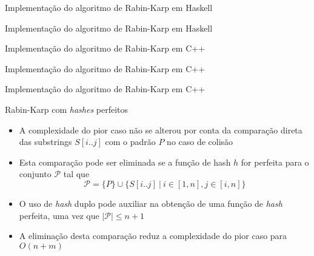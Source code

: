 \begin{frame}[fragile]{Implementação do algoritmo de Rabin-Karp em Haskell}
\end{frame}

\begin{frame}[fragile]{Implementação do algoritmo de Rabin-Karp em Haskell}
\end{frame}

\begin{frame}[fragile]{Implementação do algoritmo de Rabin-Karp em C++}
\end{frame}

\begin{frame}[fragile]{Implementação do algoritmo de Rabin-Karp em C++}
\end{frame}

\begin{frame}[fragile]{Implementação do algoritmo de Rabin-Karp em C++}
\end{frame}


\begin{frame}[fragile]{Rabin-Karp com {\it hashes} perfeitos}

    \begin{itemize}
        \item A complexidade do pior caso não se alterou por conta da comparação direta das
            substrings $S[i..j]$ com o padrão $P$ no caso de colisão

        \item Esta comparação pode ser eliminada se a função de hash $h$ for perfeita para 
            o conjunto $\mathcal{P}$ tal que
        \[
            \mathcal{P} = \lbrace P \rbrace \cup \lbrace S[i..j]\ |\ i\in [1,n], j\in [i,n]\rbrace
        \]

        \item O uso de \textit{hash} duplo pode auxiliar na obtenção de uma função de
            \textit{hash} perfeita, uma vez que $|\mathcal{P}| \leq n + 1$            
 
        \item A eliminação desta comparação reduz a complexidade do pior caso para 
            $O(n + m)$
    \end{itemize}

\end{frame}

